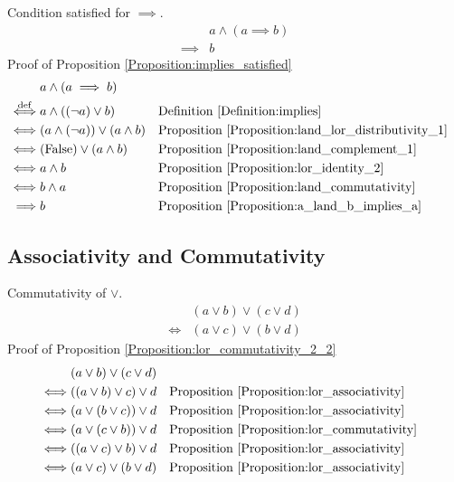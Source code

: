 \begin{prop}
\label{Proposition:implies_satisfied}
Condition satisfied for $\implies$.
\begin{align*}
& a \land (a \implies b) \\
\implies & b
\end{align*}
Proof of Proposition \ref{Proposition:implies_satisfied}
\begin{align*}
& a \land (a \implies b) \\
\overset{\operatorname{def}}{\iff} & a \land ((\lnot a) \lor b)
& & \text{Definition \ref{Definition:implies}} \\
\iff & (a \land (\lnot a)) \lor (a \land b)
& & \text{Proposition \ref{Proposition:land_lor_distributivity_1}} \\
\iff & (\text{False}) \lor (a \land b)
& & \text{Proposition \ref{Proposition:land_complement_1}} \\
\iff & a \land b
& & \text{Proposition \ref{Proposition:lor_identity_2}} \\
\iff & b \land a
& & \text{Proposition \ref{Proposition:land_commutativity}} \\
\implies & b
& & \text{Proposition \ref{Proposition:a_land_b_implies_a}} \\
\end{align*}
\end{prop}

\subsection{Associativity and Commutativity}
\begin{prop}
\label{Proposition:lor_commutativity_2_2}
Commutativity of $\lor$.
\begin{align*}
& (a \lor b) \lor (c \lor d) \\
\iff & (a \lor c) \lor (b \lor d)
\end{align*}
Proof of Proposition \ref{Proposition:lor_commutativity_2_2}
\begin{align*}
& (a \lor b) \lor (c \lor d) \\
\iff & ((a \lor b) \lor c) \lor d
& & \text{Proposition \ref{Proposition:lor_associativity}} \\
\iff & (a \lor (b \lor c)) \lor d
& & \text{Proposition \ref{Proposition:lor_associativity}} \\
\iff & (a \lor (c \lor b)) \lor d
& & \text{Proposition \ref{Proposition:lor_commutativity}} \\
\iff & ((a \lor c) \lor b) \lor d
& & \text{Proposition \ref{Proposition:lor_associativity}} \\
\iff & (a \lor c) \lor (b \lor d)
& & \text{Proposition \ref{Proposition:lor_associativity}} \\
\end{align*}
\end{prop}

